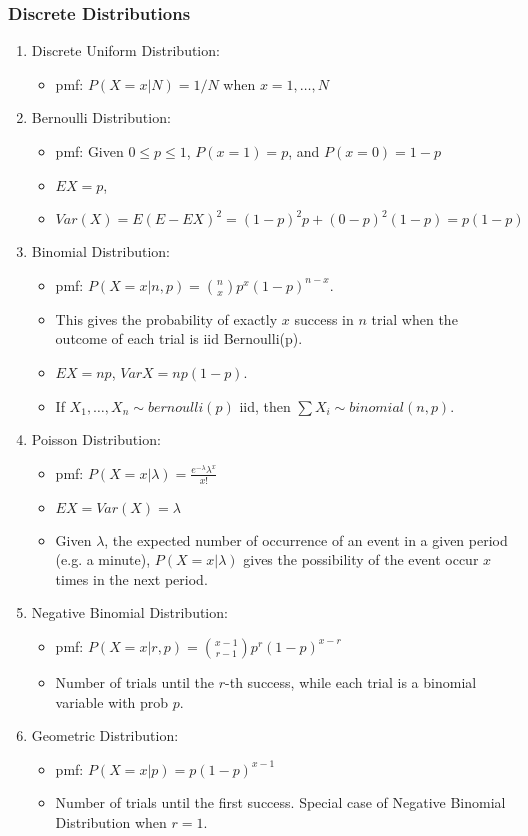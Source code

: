 \documentclass[12pt]{amsart}
\numberwithin{equation}{section}
\theoremstyle{plain}
\theoremstyle{definition}
\begin{document}
\subsubsection{Discrete Distributions}
\begin{enumerate}
\item Discrete Uniform Distribution: 
\begin{itemize}
\item pmf: $P(X=x|N) = 1/N$ when $x=1,\ldots, N$
\end{itemize}

\item Bernoulli Distribution:
\begin{itemize}
\item pmf: Given $0\leq p\leq 1$, $P(x=1)=p$, and $P(x=0)=1-p$
\item $EX=p$, 
\item $Var(X) = E(E-EX)^2 = (1-p)^2p+(0-p)^2(1-p)=p(1-p)$
\end{itemize}

\item Binomial Distribution:
\begin{itemize}
\item pmf: $P(X=x|n,p) = {{n} \choose {x}}p^x(1-p)^{n-x}$.
\item This gives the probability of exactly $x$ success in $n$ trial when the outcome of each trial is iid Bernoulli(p).
\item $EX= np$, $VarX = np(1-p)$.
\item If $X_1,\ldots, X_n\sim bernoulli(p)$ iid, then $\sum X_i\sim binomial(n,p)$.
\end{itemize}


\item Poisson Distribution:
\begin{itemize}
\item pmf: $P(X=x|\lambda) = \frac{e^{-\lambda}\lambda^x}{x!}$
\item $EX = Var(X) = \lambda$
\item Given $\lambda$, the expected number of occurrence of an event in a given period (e.g. a minute), $P(X=x|\lambda)$ gives the possibility of the event occur $x$ times in the next period.
\end{itemize}

\item Negative Binomial Distribution:
\begin{itemize}
\item pmf: $P(X=x|r,p) = {{x-1}\choose{r-1}}p^r(1-p)^{x-r}$
\item Number of trials until the $r$-th success, while each trial is a binomial variable with prob $p$.
\end{itemize}

\item Geometric Distribution:
\begin{itemize}
\item pmf: $P(X=x|p) = p(1-p)^{x-1}$
\item Number of trials until the first success. Special case of Negative Binomial Distribution when $r=1$.
\end{itemize}
\end{enumerate}
\end{document}
